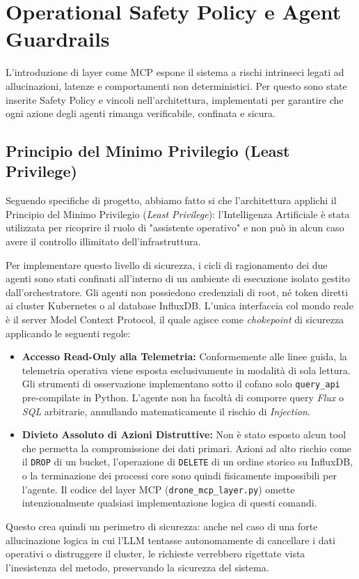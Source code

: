 
\chapter{Operational Safety Policy e Agent Guardrails}
\label{cap:safety_guardrails}

L'introduzione di layer come MCP espone il sistema a rischi intrinseci legati ad allucinazioni, latenze e comportamenti non deterministici. Per questo sono state inserite Safety Policy e vincoli nell'architettura, implementati per garantire che ogni azione degli agenti rimanga verificabile, confinata e sicura.

\section{Principio del Minimo Privilegio (Least Privilege)}
\label{sec:least_privilege}
Seguendo specifiche di progetto, abbiamo fatto si che l'architettura applichi il Principio del Minimo Privilegio (\textit{Least Privilege}): l'Intelligenza Artificiale è stata utilizzata per ricoprire il ruolo di "assistente operativo" e non può in alcun caso avere il controllo illimitato dell'infrastruttura.

Per implementare questo livello di sicurezza, i cicli di ragionamento dei due agenti sono stati confinati all'interno di un ambiente di esecuzione isolato gestito dall'orchestratore. Gli agenti non possiedono credenziali di root, né token diretti ai cluster Kubernetes o al database InfluxDB. L'unica interfaccia col mondo reale è il server Model Context Protocol, il quale agisce come \textit{chokepoint} di sicurezza applicando le seguenti regole:

\begin{itemize}
    \item \textbf{Accesso Read-Only alla Telemetria:} Conformemente alle linee guida, la telemetria operativa viene esposta esclusivamente in modalità di sola lettura. Gli strumenti di osservazione implementano sotto il cofano solo \texttt{query\_api} pre-compilate in Python. L'agente non ha facoltà di comporre query \textit{Flux} o \textit{SQL} arbitrarie, annullando matematicamente il rischio di \textit{Injection}.
    
    \item \textbf{Divieto Assoluto di Azioni Distruttive:} Non è stato esposto alcun tool che permetta la compromissione dei dati primari. Azioni ad alto rischio come il \texttt{DROP} di un bucket, l'operazione di \texttt{DELETE} di un ordine storico su InfluxDB, o la terminazione dei processi core sono quindi fisicamente impossibili per l'agente. Il codice del layer MCP (\texttt{drone\_mcp\_layer.py}) omette intenzionalmente qualsiasi implementazione logica di questi comandi.
\end{itemize}
Questo crea quindi un perimetro di sicurezza: anche nel caso di una forte allucinazione logica in cui l'LLM tentasse autonomamente di cancellare i dati operativi o distruggere il cluster, le richieste verrebbero rigettate vista l'inesistenza del metodo, preservando la sicurezza del sistema.

